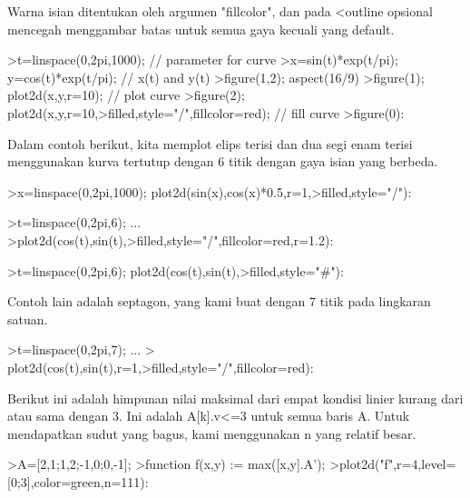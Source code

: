 \documentclass[a4paper,10pt]{article}
\begin{document}
\begin{eulernotebook}
\begin{eulercomment}
\begin{eulercomment}
\begin{eulercomment}
\begin{eulercomment}
\begin{eulercomment}
\begin{eulercomment}
\begin{eulercomment}
\begin{eulercomment}
\begin{eulercomment}
\begin{eulercomment}
\begin{eulercomment}
\begin{eulercomment}
\begin{eulercomment}
\begin{eulercomment}
\begin{eulercomment}
Warna isian ditentukan oleh argumen "fillcolor", dan pada \textless{}outline
opsional mencegah menggambar batas untuk semua gaya kecuali yang
default.
\end{eulercomment}
\begin{eulerprompt}
>t=linspace(0,2pi,1000); // parameter for curve
>x=sin(t)*exp(t/pi); y=cos(t)*exp(t/pi); // x(t) and y(t)
>figure(1,2); aspect(16/9)
>figure(1); plot2d(x,y,r=10); // plot curve
>figure(2); plot2d(x,y,r=10,>filled,style="/",fillcolor=red); // fill curve
>figure(0):
\end{eulerprompt}
\begin{eulercomment}
Dalam contoh berikut, kita memplot elips terisi dan dua segi enam
terisi menggunakan kurva tertutup dengan 6 titik dengan gaya isian
yang berbeda.
\end{eulercomment}
\begin{eulerprompt}
>x=linspace(0,2pi,1000); plot2d(sin(x),cos(x)*0.5,r=1,>filled,style="/"):
\end{eulerprompt}
\begin{eulerprompt}
>t=linspace(0,2pi,6); ...
>plot2d(cos(t),sin(t),>filled,style="/",fillcolor=red,r=1.2):
\end{eulerprompt}
\begin{eulerprompt}
>t=linspace(0,2pi,6); plot2d(cos(t),sin(t),>filled,style="#"):
\end{eulerprompt}
\begin{eulercomment}
Contoh lain adalah septagon, yang kami buat dengan 7 titik pada
lingkaran satuan.
\end{eulercomment}
\begin{eulerprompt}
>t=linspace(0,2pi,7);  ...
> plot2d(cos(t),sin(t),r=1,>filled,style="/",fillcolor=red):
\end{eulerprompt}
\begin{eulercomment}
Berikut ini adalah himpunan nilai maksimal dari empat kondisi linier
kurang dari atau sama dengan 3. Ini adalah A[k].v\textless{}=3 untuk semua baris
A. Untuk mendapatkan sudut yang bagus, kami menggunakan n yang relatif
besar.
\end{eulercomment}
\begin{eulerprompt}
>A=[2,1;1,2;-1,0;0,-1];
>function f(x,y) := max([x,y].A');
>plot2d("f",r=4,level=[0;3],color=green,n=111):
\end{eulerprompt}

\end{eulercomment}
\end{eulercomment}
\end{eulercomment}
\end{eulercomment}
\end{eulercomment}
\end{eulercomment}
\end{eulercomment}
\end{eulercomment}
\end{eulercomment}
\end{eulercomment}
\end{eulercomment}
\end{eulercomment}
\end{eulercomment}
\end{eulercomment}
\end{eulernotebook}
\end{document}
